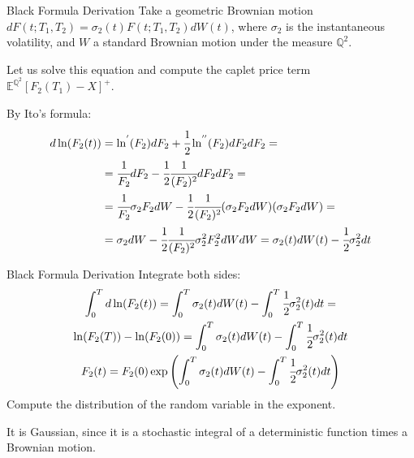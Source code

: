 \documentclass{beamer}
\begin{document}
\begin{frame}{Black Formula Derivation}
Take a geometric Brownian motion $dF(t; T_1, T_2) = \sigma_2(t) F(t; T_1, T_2)dW(t)$, where $\sigma_2$ is the instantaneous volatility, and $W$ a standard Brownian motion under the measure $\mathbb{Q}^2$.

Let us solve this equation and compute the caplet price term $\mathbb{E}^{\mathbb{Q}^2}[F_2(T_1) - X]^+$.

By Ito’s formula:
\begin{equation*}
\begin{aligned}
d\ln(F_2(t)) &= \ln^{'}(F_2)dF_2 + \cfrac{1}{2} \ln^{''}(F_2) dF_2 dF_2 =\\
&=\cfrac{1}{F_2}dF_2 - \cfrac{1}{2}\cfrac{1}{(F_2)^2} dF_2 dF_2 = \\
&=\cfrac{1}{F_2}\sigma_2 F_2dW - \cfrac{1}{2}\cfrac{1}{(F_2)^2}  (\sigma_2 F_2 dW)(\sigma_2 F_2 dW) = \\
&= \sigma_2 dW - \cfrac{1}{2}\cfrac{1}{(F_2)^2}\sigma^2_2 F^2_2 dWdW = \sigma_2(t) dW(t) - \cfrac{1}{2}\sigma^2_2 dt
\end{aligned}
\end{equation*}
\end{frame}

\begin{frame}{Black Formula Derivation}
Integrate both sides:
\begin{equation*}
\begin{gathered}
\int_0^T d \ln(F_2(t)) = \int_0^T \sigma_2(t)dW(t) - \int_0^T  \cfrac{1}{2}\sigma^2_2(t)dt = \\
\ln(F_2(T)) - \ln(F_2(0)) = \int_0^T \sigma_2(t)dW(t) - \int_0^T  \cfrac{1}{2}\sigma^2_2(t)dt \\
F_2(t) = F_2(0)\exp\left(\int_0^T \sigma_2(t)dW(t) - \int_0^T  \cfrac{1}{2}\sigma^2_2(t)dt\right)
\end{gathered}
\end{equation*}
Compute the distribution of the random variable in the exponent.

It is Gaussian, since it is a stochastic integral of a deterministic function times
a Brownian motion.
\end{frame}
\end{document}
